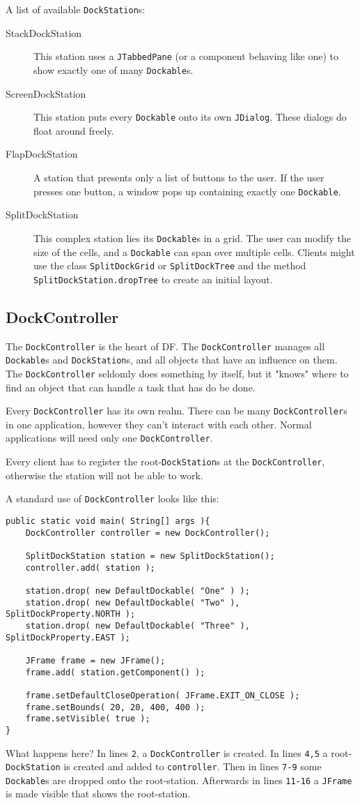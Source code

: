 \documentclass[a4paper,10pt]{article}
\newcommand{\src}[1]{\lstinline[basicstyle=\ttfamily]|#1|}
\begin{document}
A list of available \src{DockStation}s:
\begin{description}
\item[StackDockStation] This station uses a \src{JTabbedPane} (or a component behaving like one) to show exactly one of many \src{Dockable}s.
\item[ScreenDockStation] This station puts every \src{Dockable} onto its own \src{JDialog}. These dialogs do float around freely.
\item[FlapDockStation] A station that presents only a list of buttons to the user. If the user presses one button, a window pops up containing exactly one \src{Dockable}.
\item[SplitDockStation] This complex station lies its \src{Dockable}s in a grid. The user can modify the size of the cells, and a \src{Dockable} can span over multiple cells. Clients might use the class \src{SplitDockGrid} or \src{SplitDockTree} and the method \src{SplitDockStation.dropTree} to create an initial layout.
\end{description}

\subsection{DockController}
The \src{DockController} is the heart of DF. The \src{DockController} manages all \src{Dockable}s and \src{DockStation}s, and all objects that have an influence on them. The \src{DockController} seldomly does something by itself, but it "knows" where to find an object that can handle a task that has do be done.

Every \src{DockController} has its own realm. There can be many \src{DockController}s in one application, however they can't interact with each other. Normal applications will need only one \src{DockController}.

Every client has to register the root-\src{DockStation}s at the \src{DockController}, otherwise the station will not be able to work.

A standard use of \src{DockController} looks like this:
\begin{lstlisting}
public static void main( String[] args ){
	DockController controller = new DockController();
	
	SplitDockStation station = new SplitDockStation();
	controller.add( station );
		
	station.drop( new DefaultDockable( "One" ) );
	station.drop( new DefaultDockable( "Two" ), SplitDockProperty.NORTH );
	station.drop( new DefaultDockable( "Three" ), SplitDockProperty.EAST );

	JFrame frame = new JFrame();
	frame.add( station.getComponent() );
		
	frame.setDefaultCloseOperation( JFrame.EXIT_ON_CLOSE );
	frame.setBounds( 20, 20, 400, 400 );
	frame.setVisible( true );
}
\end{lstlisting}
What happens here? In lines \src{2}, a \src{DockController} is created. In lines \src{4,5} a root-\src{DockStation} is created and added to \src{controller}. Then in lines \src{7-9} some \src{Dockable}s are dropped onto the root-station. Afterwards in lines \src{11-16} a \src{JFrame} is made visible that shows the root-station.
\end{document}
